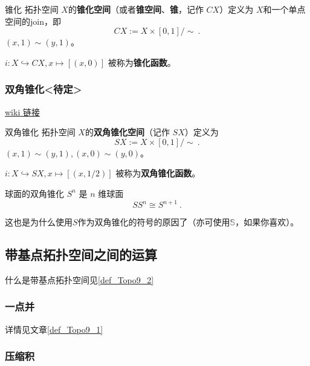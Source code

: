 \begin{definition}{锥化}
拓扑空间 $X$的\textbf{锥化空间}（或者\textbf{锥空间}、\textbf{锥}，记作 $C X$）定义为 $X$和一个单点空间的join，即
\[
    C X := X \times [0,1] / \sim~.
\]
$(x, 1) \sim (y, 1)$。

$i: X \hookrightarrow C X, x \mapsto [(x, 0)]$ 被称为\textbf{锥化函数}。
\end{definition}


\subsubsection{双角锥化<待定>}

\href{https://en.wikipedia.org/wiki/Suspension_(topology)}{wiki 链接}

\begin{definition}{双角锥化}
拓扑空间 $X$的\textbf{双角锥化空间}（记作 $S X$）定义为
\[
    S X := X \times [0,1] / \sim~.
\]
$(x, 1) \sim (y, 1), (x, 0) \sim (y, 0)$。

$i: X \hookrightarrow S X, x \mapsto [(x, 1/2)]$ 被称为\textbf{双角锥化函数}。
\end{definition}

\begin{theorem}{球面的双角锥化}
$S^n$ 是 $n$ 维球面
\[
S S^n \cong S^{n+1}~.
\]
\end{theorem}
这也是为什么使用$S$作为双角锥化的符号的原因了（亦可使用$\mathbb{S}$，如果你喜欢）。


\subsection{带基点拓扑空间之间的运算}

什么是带基点拓扑空间见\autoref{def_Topo9_2}~

\subsubsection{一点并}

详情见文章\autoref{def_Topo9_1}~


\subsubsection{压缩积}

